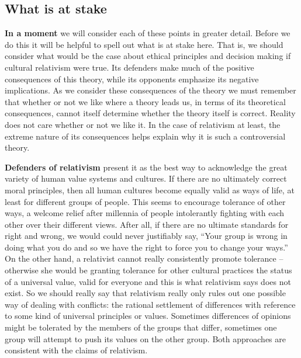 \documentclass[]{book}
\begin{document}
\hypertarget{what-is-at-stake}{%
\subsection*{What is at stake}\label{what-is-at-stake}}


\textbf{In a moment} we will consider each of these points in greater detail. Before we do this it will be helpful to spell out what is at stake here. That is, we should consider what would be the case about ethical principles and decision making if cultural relativism were true. Its defenders make much of the positive consequences of this theory, while its opponents emphasize its negative implications. As we consider these consequences of the theory we must remember that whether or not we like where a theory leads us, in terms of its theoretical consequences, cannot itself determine whether the theory itself is correct. Reality does not care whether or not we like it. In the case of relativism at least, the extreme nature of its consequences helps explain why it is such a controversial theory.

\textbf{Defenders of relativism} present it as the best way to acknowledge the great variety of human value systems and cultures. If there are no ultimately correct moral principles, then all human cultures become equally valid as ways of life, at least for different groups of people. This seems to encourage tolerance of other ways, a welcome relief after millennia of people intolerantly fighting with each other over their different views. After all, if there are no ultimate standards for right and wrong, we would could never justifiably say, ``Your group is wrong in doing what you do and so we have the right to force you to change your ways.'' On the other hand, a relativist cannot really consistently promote tolerance -- otherwise she would be granting tolerance for other cultural practices the status of a universal value, valid for everyone and this is what relativism says does not exist. So we should really say that relativism really only rules out one possible way of dealing with conflicts: the rational settlement of differences with reference to some kind of universal principles or values. Sometimes differences of opinions might be tolerated by the members of the groups that differ, sometimes one group will attempt to push its values on the other group. Both approaches are consistent with the claims of relativism.
\end{document}
